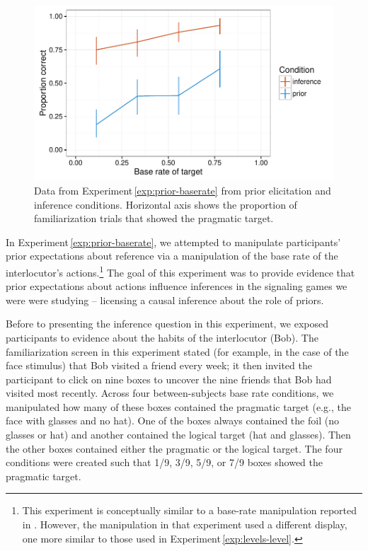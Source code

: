 \documentclass[man,noapacite]{apa2}
\newcounter{Experiment}
\newcommand{\exptref}[1]{Experiment\,\ref{#1}}
\begin{document}
\begin{figure}[t]
  \centering
  \includegraphics[width=5in]{../plots/2-prior-baserates.pdf}
  \caption{\label{fig:prior-baserate} Data from \exptref{exp:prior-baserate} from prior elicitation and inference conditions. Horizontal axis shows the proportion of familiarization trials that showed the pragmatic target.}
\end{figure}

In \exptref{exp:prior-baserate}, we attempted to manipulate participants' prior expectations about reference via a manipulation of the base rate of the interlocutor's actions.\footnote{This experiment is conceptually similar to a base-rate manipulation reported in . However, the manipulation in that experiment used a different display, one more similar to those used in \exptref{exp:levels-level}.} The goal of this experiment was to provide evidence that prior expectations about actions influence inferences in the signaling games we were were studying -- licensing a causal inference about the role of priors.

Before to presenting the inference question in this experiment, we exposed participants to evidence about the habits of the interlocutor (Bob). The familiarization screen in this experiment stated (for example, in the case of the face stimulus) that Bob visited a friend every week; it then invited the participant to click on nine boxes to uncover the nine friends that Bob had visited most recently. Across four between-subjects base rate conditions, we manipulated how many of these boxes contained the pragmatic target (e.g., the face with glasses and no hat). One of the boxes always contained the foil (no glasses or hat) and another contained the logical target (hat and glasses). Then the other boxes contained either the pragmatic or the logical target. The four conditions were created such that 1/9, 3/9, 5/9, or 7/9 boxes showed the pragmatic target.
\end{document}
